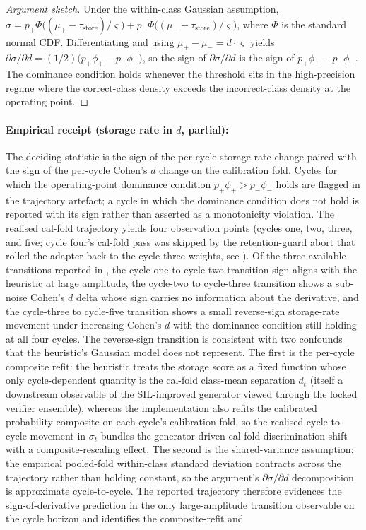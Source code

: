\begin{proof}[Argument sketch]
Under the within-class Gaussian assumption,
\(\sigma = p_{+} \Phi\!\big((\mu_{+} - \tau_{\text{store}})/\varsigma\big) + p_{-} \Phi\!\big((\mu_{-} - \tau_{\text{store}})/\varsigma\big)\),
where $\Phi$ is the standard normal CDF. Differentiating and using $\mu_{+} - \mu_{-} = d \cdot \varsigma$ yields
\(\partial \sigma / \partial d = (1/2)\big(p_{+} \phi_{+} - p_{-} \phi_{-}\big)\),
so the sign of $\partial \sigma / \partial d$ is the sign of $p_{+}\phi_{+} - p_{-}\phi_{-}$. The dominance condition holds whenever the threshold sits in the high-precision regime where the correct-class density exceeds the incorrect-class density at the operating point.
\end{proof}

\paragraph{Empirical receipt (storage rate in $d$, partial):} The deciding statistic is the sign of the per-cycle storage-rate change paired with the sign of the per-cycle Cohen's $d$ change on the calibration fold. Cycles for which the operating-point dominance condition $p_{+}\phi_{+} > p_{-}\phi_{-}$ holds are flagged in the trajectory artefact; a cycle in which the dominance condition does not hold is reported with its sign rather than asserted as a monotonicity violation. The realised cal-fold trajectory yields four observation points (cycles one, two, three, and five; cycle four's cal-fold pass was skipped by the retention-guard abort that rolled the adapter back to the cycle-three weights, see ). Of the three available transitions reported in , the cycle-one to cycle-two transition sign-aligns with the heuristic at large amplitude, the cycle-two to cycle-three transition shows a sub-noise Cohen's $d$ delta whose sign carries no information about the derivative, and the cycle-three to cycle-five transition shows a small reverse-sign storage-rate movement under increasing Cohen's $d$ with the dominance condition still holding at all four cycles. The reverse-sign transition is consistent with two confounds that the heuristic's Gaussian model does not represent. The first is the per-cycle composite refit: the heuristic treats the storage score as a fixed function whose only cycle-dependent quantity is the cal-fold class-mean separation $d_{t}$ (itself a downstream observable of the SIL-improved generator viewed through the locked verifier ensemble), whereas the implementation also refits the calibrated probability composite on each cycle's calibration fold, so the realised cycle-to-cycle movement in $\sigma_{t}$ bundles the generator-driven cal-fold discrimination shift with a composite-rescaling effect. The second is the shared-variance assumption: the empirical pooled-fold within-class standard deviation contracts across the trajectory rather than holding constant, so the argument's $\partial \sigma / \partial d$ decomposition is approximate cycle-to-cycle. The reported trajectory therefore evidences the sign-of-derivative prediction in the only large-amplitude transition observable on the cycle horizon and identifies the composite-refit and 